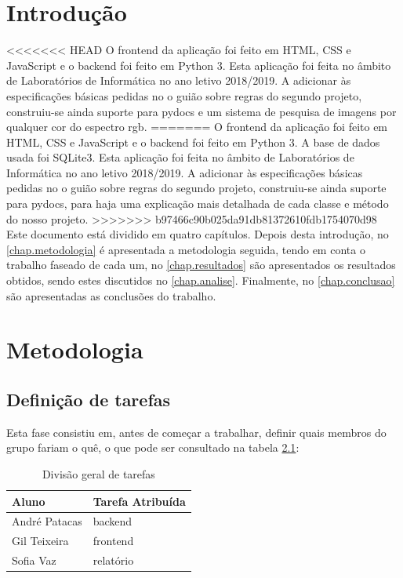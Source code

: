 \documentclass{report}
\begin{document}
\tableofcontents
 \listoftables     %
 \listoffigures    %


\clearpage
{}

\chapter{Introdução}
\label{chap.introducao}

<<<<<<< HEAD
O frontend da aplicação foi feito em \ac{HTML}, \ac{CSS} e JavaScript e o backend foi feito em Python 3. Esta aplicação foi feita no âmbito de Laboratórios de Informática no ano letivo 2018/2019.
A adicionar às especificações básicas pedidas no o guião sobre regras do segundo projeto, construiu-se ainda suporte para pydocs e um sistema de pesquisa de imagens por qualquer cor do espectro rgb.
=======
O frontend da aplicação foi feito em \ac{HTML}, \ac{CSS} e JavaScript e o backend foi feito em Python 3. A base de dados usada foi SQLite3. Esta aplicação foi feita no âmbito de Laboratórios de Informática no ano letivo 2018/2019.
A adicionar às especificações básicas pedidas no o guião sobre regras do segundo projeto, construiu-se ainda suporte para pydocs, para haja uma explicação mais detalhada de cada classe e método do nosso projeto.
>>>>>>> b97466c90b025da91db81372610fdb1754070d98
Este documento está dividido em quatro capítulos.
Depois desta introdução,
no \autoref{chap.metodologia} é apresentada a metodologia seguida, tendo em conta o trabalho faseado de cada um, 
no \autoref{chap.resultados} são apresentados os resultados obtidos,
sendo estes discutidos no \autoref{chap.analise}.
Finalmente, no \autoref{chap.conclusao} são apresentadas
as conclusões do trabalho.

\chapter{Metodologia}
\label{chap.metodologia}
\section{Definição de tarefas}
Esta fase consistiu em, antes de começar a trabalhar, definir quais membros do grupo fariam o quê, o que pode ser consultado na tabela \ref{tab:table1}: 
\begin{table}[h!]
\begin{center}
\caption{Divisão geral de tarefas}
\begin{tabular}{l|l}
\hline
\multicolumn{1}{|l|}{Aluno} & \multicolumn{1}{l|}{Tarefa Atribuída} \\ \hline
            André Patacas   & backend                               \\ 
            Gil Teixeira      & frontend                               \\
            Sofia Vaz         & relatório                                
\end{tabular}
\label{tab:table1}
\end{center}
\end{table}
\end{document}
